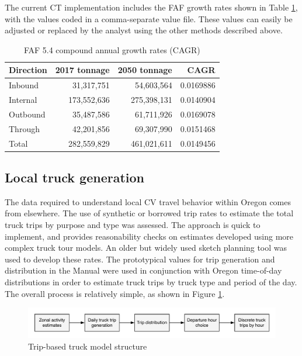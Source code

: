 The current CT implementation includes the FAF growth rates shown in Table \ref{tab:faf-growth-rates}, with the values coded in a comma-separate value file. These values can easily be adjusted or replaced by the analyst using the other methods described above.

\begin{table}
\centering
\caption{FAF 5.4 compound annual growth rates (CAGR)}
\label{tab:faf-growth-rates}
\begin{tabular}{lrrr}
\hline
Direction & 2017 tonnage & 2050 tonnage & CAGR \\
\hline
Inbound & 31,317,751 & 54,603,564 & 0.0169886 \\
Internal & 173,552,636 & 275,398,131 & 0.0140904 \\
Outbound & 35,487,586 & 61,711,926 & 0.0169078 \\
Through & 42,201,856 & 69,307,990 & 0.0151468 \\
\hline
Total & 282,559,829 & 461,021,611 & 0.0149456 \\
\hline
\end{tabular}
\end{table}

\subsection{Local truck generation}

The data required to understand local CV travel behavior within Oregon comes from elsewhere. The use of synthetic or borrowed trip rates to estimate the total truck trips by purpose and type was assessed. The approach is quick to implement, and provides reasonability checks on estimates developed using more complex truck tour models. An older but widely used sketch planning tool \citep{beagan07} was used to develop these rates. The prototypical values for trip generation and distribution in the Manual were used in conjunction with Oregon time-of-day distributions in order to estimate truck trips by truck type and period of the day. The overall process is relatively simple, as shown in Figure \ref{fig:ct-trip-model}.

\begin{figure}[!b]
\centering
\includegraphics[width=6in]{figures/ct-trip-model.pdf}
\caption{Trip-based truck model structure}
\label{fig:ct-trip-model}
\end{figure}

